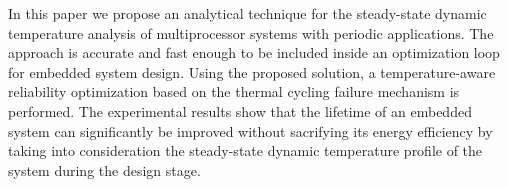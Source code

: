 In this paper we propose an analytical technique for the steady-state dynamic temperature analysis of multiprocessor systems with periodic applications. The approach is accurate and fast enough to be included inside an optimization loop for embedded system design. Using the proposed solution, a temperature-aware reliability optimization based on the thermal cycling failure mechanism is performed. The experimental results show that the lifetime of an embedded system can significantly be improved without sacrifying its energy efficiency by taking into consideration the steady-state dynamic temperature profile of the system during the design stage.
